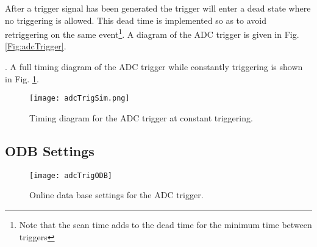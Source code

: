 After a trigger signal has been generated the trigger will enter a dead state where no triggering is allowed. This dead time is implemented so as to avoid retriggering on the same event\footnote{Note that the scan time adds to the dead time for the minimum time between triggers}. A diagram of the ADC trigger is given in Fig. \ref{Fig:adcTrigger}. 

. A full timing diagram of the ADC trigger while constantly triggering is shown in Fig. \ref{Fig:adcSim}. 

\begin{landscape}
	\vspace*{\fill}
	\begin{figure}[ht]
	\centering
	\texttt{[image: adcTrigSim.png]}
	\caption{Timing diagram for the ADC trigger at constant triggering.}
	\label{Fig:adcSim}
	\end{figure}
	\vspace*{\fill}
\end{landscape}


\subsection{ODB Settings}
\label{sec:adcTrigODB}
\begin{figure}[ht]
\centering
\texttt{[image: adcTrigODB]}
\caption{Online data base settings for the ADC trigger.}
\label{Fig:adcTrigODB}
\end{figure}

